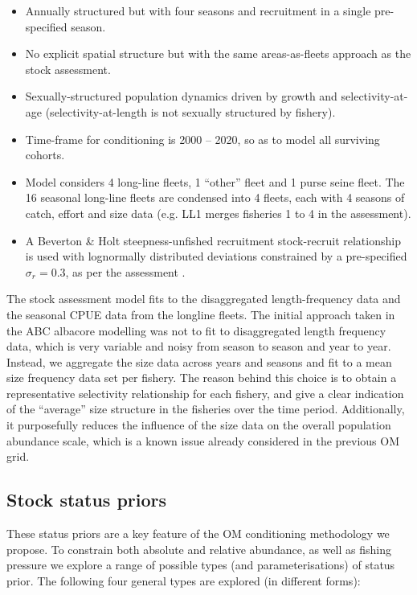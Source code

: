 \documentclass[11pt]{article}
\begin{document}
\begin{itemize}
    \item Annually structured but with four seasons and recruitment in a single pre-specified season.
    \item No explicit spatial structure but with the same areas-as-fleets approach as the stock assessment.
    \item Sexually-structured population dynamics driven by growth and selectivity-at-age (selectivity-at-length is not sexually structured by fishery).
    \item Time-frame for conditioning is 2000 -- 2020, so as to model all surviving cohorts.
    \item Model considers 4 long-line fleets, 1 ``other'' fleet and 1 purse seine fleet. The 16 seasonal long-line fleets are condensed into 4 fleets, each with 4 seasons of catch, effort and size data (e.g. LL1 merges fisheries 1 to 4 in the assessment).
    \item A Beverton \& Holt steepness-unfished recruitment stock-recruit relationship is used with lognormally distributed deviations constrained by a pre-specified $\sigma_r=0.3$, as per the assessment \cite{albsa}.
\end{itemize}

The stock assessment model fits to the disaggregated length-frequency data and the seasonal CPUE data from the longline fleets. The initial approach taken in the ABC albacore modelling was not to fit to disaggregated length frequency data, which is very variable and noisy from season to season and year to year. Instead, we aggregate the size data across years and seasons and fit to a mean size frequency data set per fishery. The reason behind this choice is to obtain a representative selectivity relationship for each fishery, and give a clear indication of the ``average'' size structure in the fisheries over the time period. Additionally, it purposefully reduces the influence of the size data on the overall population abundance scale, which is a known issue already considered in the previous OM grid.

\subsection{Stock status priors}

These status priors are a key feature of the OM conditioning methodology we propose. To constrain both absolute and relative abundance, as well as fishing pressure we explore a range of possible types (and parameterisations) of status prior. The following four general types are explored (in different forms):
\end{document}
